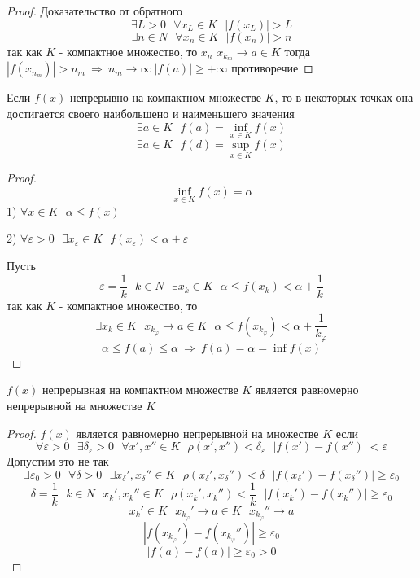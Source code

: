 \begin{proof}
  Доказательство от обратного
  $$
  \exists L > 0 ~~~ \forall x_L \in K ~~~ |f(x_L)| > L
  $$
  $$
  \exists n \in N ~~~ \forall x_n \in K ~~~ |f(x_n)| > n
  $$
  так как $K$ - компактное множество, то $x_n$ $x_{k_m} \to a \in K$ тогда
  $|f(x_{n_m})| > n_m ~ \Rightarrow ~ n_m \to \infty ~ |f(a)| \ge +\infty$
  противоречие
\end{proof}


\begin{theorem}
  Если $f(x)$ непрерывно на компактном множестве $K$, то в некоторых точках она
  достигается своего наибольшено и наименьшего значения
  $$
  \exists a \in K ~~~ f(a) = \inf \limits_{x \in K} f(x)
  $$
  $$
  \exists a \in K ~~~ f(d) = \sup \limits_{x \in K} f(x)
  $$
\end{theorem}

\begin{proof}
  $$
  \inf \limits_{x \in K} f(x) = \alpha
  $$
  1) $\forall x \in K ~~~ \alpha \le f(x)$

  2) $\forall \varepsilon > 0 ~~~ \exists x_{\varepsilon} \in K ~~~
  f(x_{\varepsilon}) < \alpha + \varepsilon$

  Пусть
  $$
  \varepsilon = \frac{1}{k} ~~~ k \in N ~~~ \exists x_k \in K ~~~
  \alpha \le f(x_k) < \alpha + \frac{1}{k}
  $$
  так как $K$ - компактное множество, то
  $$
  \exists x_k \in K ~~~ x_{k_{\varphi}} \to a \in K ~~~ \alpha \le
  f(x_{k_{\varphi}}) < \alpha + \frac{1}{k_{\varphi}}
  $$
  $$
  \alpha \le f(a) \le \alpha ~ \Rightarrow ~ f(a) = \alpha = \inf f(x)
  $$
\end{proof}

\begin{theorem}
  $f(x)$ непрерывная на компактном множестве $K$ является равномерно
  непрерывной на множестве $K$
\end{theorem}

\begin{proof}
  $f(x)$ является равномерно непрерывной на множестве $K$ если
  $$
  \forall \varepsilon > 0 ~~~ \exists \delta_{\varepsilon} > 0 ~~~
  \forall x', x'' \in K ~~~ \rho(x', x'') < \delta_{\varepsilon} ~~~
  |f(x') - f(x'')| < \varepsilon
  $$
  Допустим это не так
  $$
  \exists \varepsilon_0 > 0 ~~~ \forall \delta > 0 ~~~ \exists x_{\delta}',
  x_{\delta}'' \in K ~~~ \rho(x_{\delta}', x_{\delta}'') < \delta ~~~
  |f(x_{\delta}') - f(x_{\delta}'')| \ge \varepsilon_0
  $$
  $$
  \delta = \frac{1}{k} ~~~ k \in N ~~~ x_k', x_k'' \in K ~~~
  \rho(x_k', x_k'') < \frac{1}{k} ~~~ |f(x_k') - f(x_k'')| \ge \varepsilon_0
  $$
  $$
  x_k' \in K ~~~ x_{k_{\varphi}}' \to a \in K ~~~ x_{k_{\varphi}}'' \to a
  $$
  $$
  |f(x_{k_{\varphi}}') - f(x_{k_{\varphi}}'')| \ge \varepsilon_0
  $$
  $$
  |f(a) - f(a)| \ge \varepsilon_0 > 0
  $$
\end{proof}

